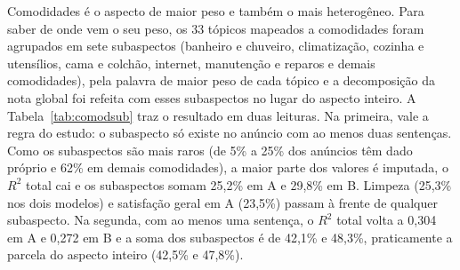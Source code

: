 Comodidades é o aspecto de maior peso e também o mais heterogêneo. Para saber de onde vem o seu peso, os 33 tópicos mapeados a comodidades foram agrupados em sete subaspectos (banheiro e chuveiro, climatização, cozinha e utensílios, cama e colchão, internet, manutenção e reparos e demais comodidades), pela palavra de maior peso de cada tópico e a decomposição da nota global foi refeita com esses subaspectos no lugar do aspecto inteiro. A Tabela~\ref{tab:comodsub} traz o resultado em duas leituras. Na primeira, vale a regra do estudo: o subaspecto só existe no anúncio com ao menos duas sentenças. Como os subaspectos são mais raros (de 5\% a 25\% dos anúncios têm dado próprio e 62\% em demais comodidades), a maior parte dos valores é imputada, o $R^2$ total cai e os subaspectos somam 25,2\% em A e 29,8\% em B. Limpeza (25,3\% nos dois modelos) e satisfação geral em A (23,5\%) passam à frente de qualquer subaspecto. Na segunda, com ao menos uma sentença, o $R^2$ total volta a 0,304 em A e 0,272 em B e a soma dos subaspectos é de 42,1\% e 48,3\%, praticamente a parcela do aspecto inteiro (42,5\% e 47,8\%).

\begin{table}[htb]
\centering
\caption{Parcela do $R^2$ da nota global por subaspecto de comodidades, com a regra de duas sentenças (regra do estudo) e com uma sentença (sensibilidade).}
\small
{}
\label{tab:comodsub}
\end{table}

